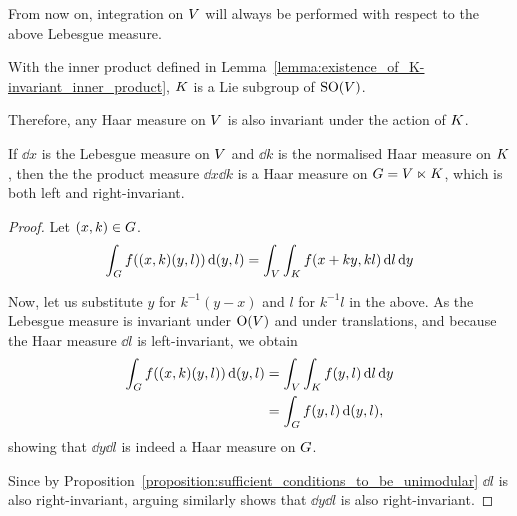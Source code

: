 From now on, integration on $V$ will always be performed with respect to the above Lebesgue measure.

\begin{lemma}
\label{lemma:K_subset_of_SO_and_invariance_of_the_induced_Lebesgue_measure}
    With the inner product defined in Lemma~\ref{lemma:existence_of_K-invariant_inner_product},
    $K$ is a Lie subgroup of ${\mathrm{SO} (V)}$.

    Therefore, any Haar measure on $V$ is also invariant under the action of $K$.
\end{lemma}

\begin{lemma}
\label{lemma:Haar_measure}
    If $\dd x$ is the Lebesgue measure on $V$ and $\dd k$ is the normalised Haar measure on $K$,
    then the the product measure $\dd x \dd k$ is a Haar measure on $G = V \ltimes K$,
    which is both left and right-invariant.
\end{lemma}
\begin{proof}
    Let $(x, k) \in G$.
    \begin{align*}
        \int_G f((x, k) (y, l)) \,\mathrm{d} (y, l)
        = \int_V \int_K f(x + ky, k l) \,\mathrm{d} l \,\mathrm{d} y
    \end{align*}

    Now, let us substitute $y$ for $k^{-1}(y - x)$ and $l$ for $k^{-1} l$ in the above.
    As the Lebesgue measure is invariant under ${\mathrm{O} (V)}$ and under translations,
    and because the Haar measure $\dd l$ is left-invariant,
    we obtain
    \begin{align*}
        \int_G f((x, k) (y, l)) \,\mathrm{d} (y, l)
        &= \int_V \int_K f(y, l) \,\mathrm{d} l \,\mathrm{d} y\\
        &= \int_G f(y, l) \,\mathrm{d} (y, l),
    \end{align*}
    showing that $\dd y \dd l$ is indeed a Haar measure on $G$.

    Since by Proposition~\ref{proposition:sufficient_conditions_to_be_unimodular} $\dd l$ is also right-invariant,
    arguing similarly shows that $\dd y \dd l$ is also right-invariant.
\end{proof}

